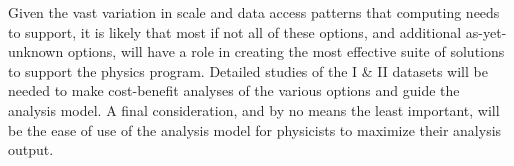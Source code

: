 \documentclass[../main-v1.tex]{subfiles}
\begin{document}
Given the vast variation in scale and data access patterns that  computing needs to support, it is likely that most if not all of these options, and additional as-yet-unknown options, will have a role in creating the most effective suite of solutions to support the physics program. Detailed studies of the  I \& II datasets will be needed to make cost-benefit analyses of the various options and guide the analysis model.  A final consideration, and by no means the least important, will be the ease of use of the analysis model for physicists to maximize their analysis output.
\end{document}
